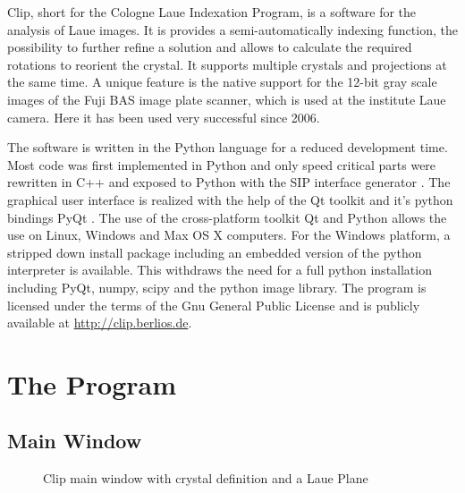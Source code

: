 


Clip, short for the Cologne Laue Indexation Program, is a software for
the analysis of Laue images. It is provides a semi-automatically
indexing function, the possibility to further refine a solution and
allows to calculate the required rotations to reorient the crystal. It
supports multiple crystals and projections at the same time. A unique
feature is the native support for the 12-bit gray scale images of the
Fuji BAS image plate scanner, which is used at the institute Laue
camera. Here it has been used very successful since 2006.

The software is written in the Python language \cite{pythonRM} for a
reduced development time. Most code was first implemented in Python
and only speed critical parts were rewritten in C++ and exposed to
Python with the SIP interface generator \cite{SIP_River}. The
graphical user interface is realized with the help of the Qt
\cite{Qt4} toolkit and it's python bindings PyQt \cite{PyQt4}. The use
of the cross-platform toolkit Qt and Python allows the use on Linux,
Windows and Max OS X computers. For the Windows platform, a stripped
down install package including an embedded version of the python
interpreter is available.  This withdraws the need for a full python
installation including PyQt, numpy, scipy and the python image
library. The program is licensed under the terms of the Gnu General
Public License \cite{GPL} and is publicly available at
\url{http://clip.berlios.de}.


\section{The Program}


\subsection{Main Window}

\begin{figure}[htb]
 \label{Clip:FigMainWindow}
\caption[Main window of Clip]{Clip main window with crystal definition
  and a Laue Plane}
\end{figure}

